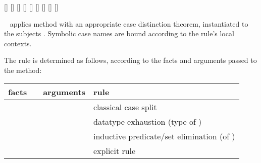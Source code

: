 \begin{isabellebody}
\begin{isamarkuptext}
\begin{railoutput}
[]
\rail@endbar
\rail@end
{}
\rail@plus
{}
[]
\rail@endplus
\rail@end
{}
[]
[]
\rail@plus
\rail@plus
{}
[]
\rail@endplus
{}[]
\rail@endplus
\rail@end
{}
[]
[]
[]
\rail@end
\end{railoutput}


  \begin{description}

  \item \hyperlink{method.cases}{\mbox{}}~ applies method \hyperlink{method.rule}{\mbox{}} with an appropriate case distinction theorem, instantiated to
  the subjects .  Symbolic case names are bound according
  to the rule's local contexts.

  The rule is determined as follows, according to the facts and
  arguments passed to the \hyperlink{method.cases}{\mbox{}} method:

  \medskip
  \begin{tabular}{llll}
    facts           &                 & arguments   & rule \\\hline
                    & \hyperlink{method.cases}{\mbox{\isa{cases}}} &             & classical case split \\
                    & \hyperlink{method.cases}{\mbox{\isa{cases}}} & \isa{t}   & datatype exhaustion (type of \isa{t}) \\
    \isa{{\isaliteral{22}{\isachardoublequote}}{\isaliteral{5C3C7475726E7374696C653E}{\isasymturnstile}}\ A\ t{\isaliteral{22}{\isachardoublequote}}} & \hyperlink{method.cases}{\mbox{\isa{cases}}} & \isa{{\isaliteral{22}{\isachardoublequote}}{\isaliteral{5C3C646F74733E}{\isasymdots}}{\isaliteral{22}{\isachardoublequote}}} & inductive predicate/set elimination (of \isa{A}) \\
    \isa{{\isaliteral{22}{\isachardoublequote}}{\isaliteral{5C3C646F74733E}{\isasymdots}}{\isaliteral{22}{\isachardoublequote}}}     & \hyperlink{method.cases}{\mbox{\isa{cases}}} & \isa{{\isaliteral{22}{\isachardoublequote}}{\isaliteral{5C3C646F74733E}{\isasymdots}}\ rule{\isaliteral{3A}{\isacharcolon}}\ R{\isaliteral{22}{\isachardoublequote}}} & explicit rule \isa{R} \\
  \end{tabular}
  \medskip


\end{description}
\end{isamarkuptext}
\end{isabellebody}
